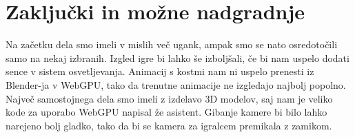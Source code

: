 \documentclass[a4paper,12pt]{article}
\begin{document}
\section{Zaključki in možne nadgradnje}
\noindent Na začetku dela smo imeli v mislih več ugank, ampak smo se nato osredotočili samo na nekaj izbranih. Izgled igre bi lahko še izboljšali, če bi nam uspelo dodati sence v sistem osvetljevanja. Animacij s kostmi nam ni uspelo prenesti iz Blender-ja v WebGPU, tako da trenutne animacije ne izgledajo najbolj popolno. Največ samostojnega dela smo imeli z izdelavo 3D modelov, saj nam je veliko kode za uporabo WebGPU napisal že asistent.
Gibanje kamere bi bilo lahko narejeno bolj gladko, tako da bi se kamera za igralcem premikala z zamikom.
\end{document}

